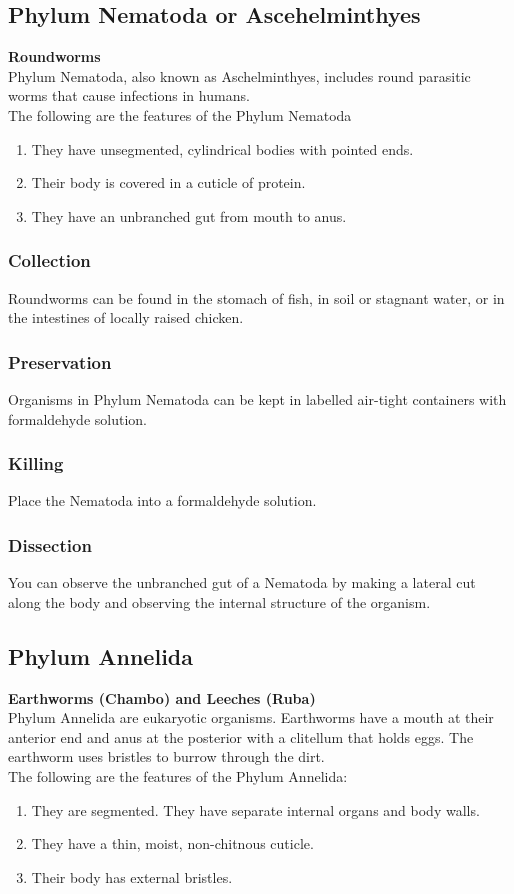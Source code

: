 \subsection{Phylum Nematoda or Ascehelminthyes}
\textbf{Roundworms}\\
Phylum Nematoda, also known as Aschelminthyes, includes round parasitic worms that cause infections in humans.\\
The following are the features of the Phylum Nematoda 
\begin{enumerate}
\item{They have unsegmented, cylindrical bodies with pointed ends.}
\item{Their body is covered in a cuticle of protein.}
\item{They have an unbranched gut from mouth to anus.}
\end{enumerate}

\subsubsection{Collection}
Roundworms can be found in the stomach of fish, in soil or stagnant water, or in the intestines of locally raised chicken.

\subsubsection{Preservation} 
Organisms in Phylum Nematoda can be kept in labelled air-tight containers with formaldehyde solution.

\subsubsection{Killing}
Place the Nematoda into a formaldehyde solution.

\subsubsection{Dissection}
You can observe the unbranched gut of a Nematoda by making a lateral cut along the body and observing the internal structure of the organism.

\subsection{Phylum Annelida}
\textbf{Earthworms (Chambo) and Leeches (Ruba)}\\ 
Phylum Annelida are eukaryotic organisms. Earthworms have a mouth at their anterior end and anus at the posterior with a clitellum that holds eggs. The earthworm uses bristles to burrow through the dirt. \\
The following are the features of the Phylum Annelida:
\begin{enumerate}
\item{They are segmented. They have separate internal organs and body walls.}
\item{They have a thin, moist, non-chitnous cuticle.}
\item{Their body has external bristles.}
\end{enumerate}

